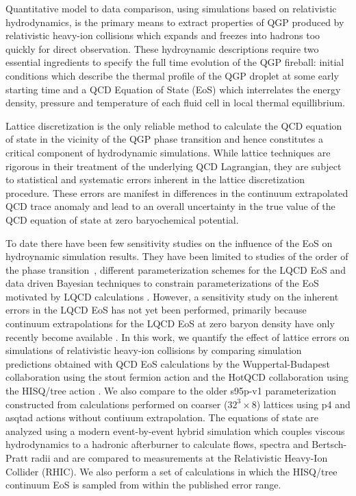 \documentclass[aps,prc,reprint,amsmath,nofootinbib,superscriptaddress]{revtex4-1}
\begin{document}
Quantitative model to data comparison, using simulations based on relativistic hydrodynamics, is the primary means to extract properties of QGP produced by relativistic heavy-ion collisions which expands and freezes into hadrons too quickly for direct observation. 
These hydroynamic descriptions require two essential ingredients to specify the full time evolution of the QGP fireball: initial conditions which describe the thermal profile of the QGP droplet at some early starting time and a QCD Equation of State (EoS) which interrelates the energy density, pressure and temperature of each fluid cell in local thermal equillibrium.

Lattice discretization is the only reliable method to calculate the QCD equation of state in the vicinity of the QGP phase transition and hence constitutes a critical component of hydrodynamic simulations. 
While lattice techniques are rigorous in their treatment of the underlying QCD Lagrangian, they are subject to statistical and systematic errors inherent in the lattice discretization procedure. 
These errors are manifest in differences in the continuum extrapolated QCD trace anomaly and lead to an overall uncertainty in the true value of the QCD equation of state at zero baryochemical potential.

To date there have been few sensitivity studies on the influence of the EoS on hydroynamic simulation results. 
They have been limited to studies of the order of the phase transition~\cite{Huovinen:2005gy}, different parameterization schemes for the LQCD EoS \cite{Huovinen:2009yb} and data driven Bayesian techniques to constrain parameterizations of the EoS motivated by LQCD calculations \cite{Pratt:2015zsa}.
However, a sensitivity study on the inherent errors in the LQCD EoS has not yet been performed, primarily because continuum extrapolations for the LQCD EoS at zero baryon density have only recently become available \cite{Borsanyi:2013bia,Bazavov:2014pvz}. 
In this work, we quantify the effect of lattice errors on simulations of relativistic heavy-ion collisions by comparing simulation predictions obtained with QCD EoS calculations by the Wuppertal-Budapest collaboration using the stout fermion action \cite{Borsanyi:2013bia} and the HotQCD collaboration using the HISQ/tree action \cite{Bazavov:2014pvz}.  
We also compare to the older s95p-v1 parameterization \cite{Huovinen:2009yb} constructed from calculations performed on coarser ($32^3 \times 8$) lattices using p4 and asqtad actions without contiuum extrapolation.  
The equations of state are analyzed using a modern event-by-event hybrid simulation which couples viscous hydrodynamics to a hadronic afterburner to calculate flows, spectra and Bertsch-Pratt radii and are compared to measurements at the Relativistic Heavy-Ion Collider (RHIC).
We also perform a set of calculations in which the HISQ/tree continuum EoS is sampled from within the published error range.
\end{document}
